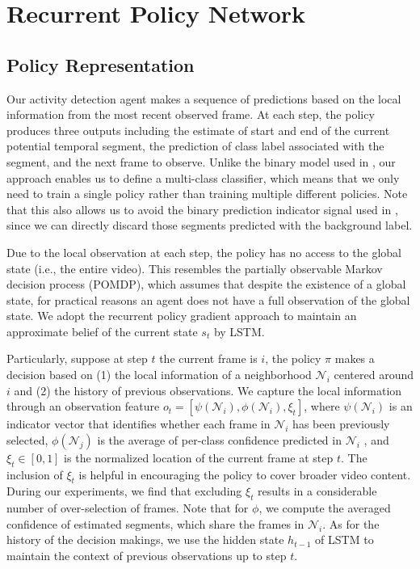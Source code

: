 \documentclass{bmvc2k}
\begin{document}
\section{Recurrent Policy Network}\label{sec:problem-statement}
\subsection{Policy Representation}
\label{sec:policy-representation}

Our activity detection agent makes a sequence of predictions based on the local information from the most recent observed frame. At each step, the policy produces three outputs including the estimate of start and end of the current potential temporal segment, the prediction of class label associated with the segment, and the next frame to observe. Unlike the binary model used in \cite{yeung2015end}, our approach enables us to define a multi-class classifier, which means that we only need to train a single policy rather than training multiple different policies. Note that this also allows us to avoid the binary prediction indicator signal used in \cite{yeung2015end}, since we can directly discard those segments predicted with the background label. 

Due to the local observation at each step, the policy has no access to the global state (i.e., the entire video). This resembles the partially observable Markov decision process (POMDP), which assumes that despite the existence of a global state, for practical reasons an agent does not have a full observation of the global state. We adopt the recurrent policy gradient approach \cite{wierstra2010recurrent} to maintain an approximate belief of the current state $s_t$ by LSTM.

Particularly, suppose at step $t$ the current frame is $i$, the policy $\pi$ makes a decision based on (1) the local information of a neighborhood $\mathcal{N}_i$ centered around $i$ and (2) the history of previous observations. We capture the local information through an observation feature  $o_t = [\psi(\mathcal{N}_i), \phi(\mathcal{N}_i), \xi_t]$, where $\psi(\mathcal{N}_i)$ is an indicator vector that identifies whether each frame in $\mathcal{N}_i$ has been previously selected, $\phi({\mathcal{N}_j})$ is the average of per-class confidence predicted in $\mathcal{N}_i$ , and $\xi_t \in [0,1]$ is the normalized location of the current frame at step $t$. The inclusion of $\xi_t$ is helpful in encouraging the policy to cover broader video content. During our experiments, we find that excluding $\xi_t$ results in a considerable number of over-selection of frames. Note that for $\phi$, we compute the averaged confidence of estimated segments, which share the frames in $\mathcal{N}_i$. As for the history of the decision makings, we use the hidden state $h_{t-1}$ of LSTM to maintain the context of previous observations up to step $t$.
\end{document}
